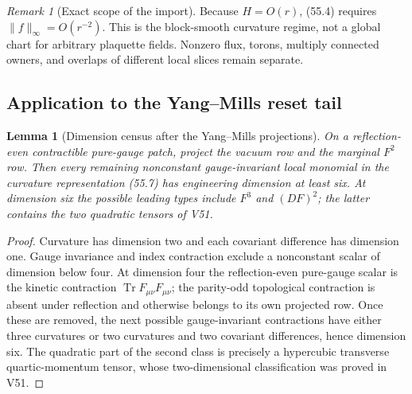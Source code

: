 \documentclass[11pt,oneside]{book}
\newtheorem{lemma}[theorem]{Lemma}
\theoremstyle{definition}
\theoremstyle{remark}
\newtheorem{remark}[theorem]{Remark}
\newcommand{\Tr}{\operatorname{Tr}}
\begin{document}
\begin{remark}[Exact scope of the import]
\label{rem:e8v55-import-scope}
Because \(H=O(r)\), (55.4) requires
\(\|f\|_\infty=O(r^{-2})\).  This is the block-smooth curvature
regime, not a global chart for arbitrary plaquette fields.
Nonzero flux, torons, multiply connected owners, and overlaps of
different local slices remain separate.
\end{remark}

\subsection{Application to the Yang--Mills reset tail}

\begin{lemma}[Dimension census after the Yang--Mills projections]
\label{lem:e8v55-dimension-census}
On a reflection-even contractible pure-gauge patch, project the
vacuum row and the marginal \(F^2\) row.  Then every remaining
nonconstant gauge-invariant local monomial in the curvature
representation (55.7) has engineering dimension at least six.
At dimension six the possible leading types include \(F^3\) and
\((D F)^2\); the latter contains the two quadratic tensors of V51.
\end{lemma}

\begin{proof}
Curvature has dimension two and each covariant difference has
dimension one.  Gauge invariance and index contraction exclude a
nonconstant scalar of dimension below four.  At dimension four the
reflection-even pure-gauge scalar is the kinetic contraction
\(\Tr F_{\mu\nu}F_{\mu\nu}\); the parity-odd topological contraction
is absent under reflection and otherwise belongs to its own
projected row.  Once these are removed, the next possible
gauge-invariant contractions have either three curvatures or two
curvatures and two covariant differences, hence dimension six.
The quadratic part of the second class is precisely a hypercubic
transverse quartic-momentum tensor, whose two-dimensional
classification was proved in V51.
\end{proof}
\end{document}
